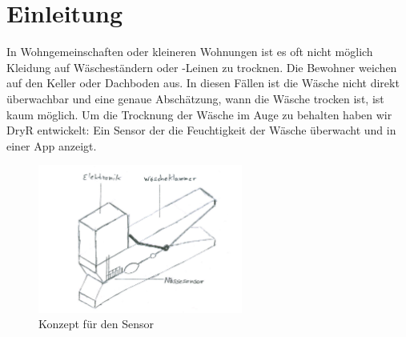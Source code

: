 \section{Einleitung}
	In Wohngemeinschaften oder kleineren Wohnungen ist es oft nicht möglich Kleidung auf Wäscheständern oder -Leinen zu trocknen. Die Bewohner weichen auf den Keller oder Dachboden aus. In diesen Fällen ist die Wäsche nicht direkt überwachbar und eine genaue Abschätzung, wann die Wäsche trocken ist, ist kaum möglich. Um die Trocknung der Wäsche im Auge zu behalten haben wir DryR entwickelt: Ein Sensor der die Feuchtigkeit der Wäsche überwacht und in einer App anzeigt.
	\begin{figure}[htb] 
		\centerline{\includegraphics[width=0.6\textwidth]{01-klammer.png}}
		\caption{Konzept für den Sensor}
		\label{einleitung_klammer}
	\end{figure}
